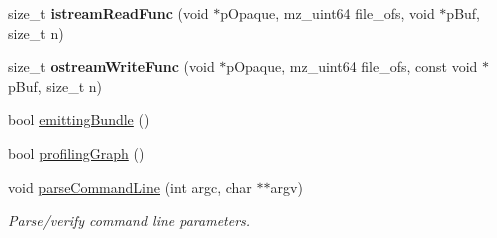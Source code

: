 \begin{DoxyCompactItemize}
\item 
\mbox{\label{namespaceglow_a4e729945d88b4bfa527188a544be28ae}} 
size\+\_\+t {\bfseries istream\+Read\+Func} (void $\ast$p\+Opaque, mz\+\_\+uint64 file\+\_\+ofs, void $\ast$p\+Buf, size\+\_\+t n)
\item 
\mbox{\label{namespaceglow_a3117c43e5a5db4bb0b77626d02db0e1c}} 
size\+\_\+t {\bfseries ostream\+Write\+Func} (void $\ast$p\+Opaque, mz\+\_\+uint64 file\+\_\+ofs, const void $\ast$p\+Buf, size\+\_\+t n)
\item 
bool \hyperlink{namespaceglow_a2f4b45dc331a5845df9ca8e95503c09b}{emitting\+Bundle} ()
\item 
bool \hyperlink{namespaceglow_a1945e52546b506e9c6692b42e6ff78bd}{profiling\+Graph} ()
\item 
\mbox{\label{namespaceglow_aefc23c570ca5e61718fee9c00d1c49ee}} 
void \hyperlink{namespaceglow_aefc23c570ca5e61718fee9c00d1c49ee}{parse\+Command\+Line} (int argc, char $\ast$$\ast$argv)
\begin{DoxyCompactList}\small\item\em Parse/verify command line parameters. \end{DoxyCompactList}\end{DoxyCompactItemize}
